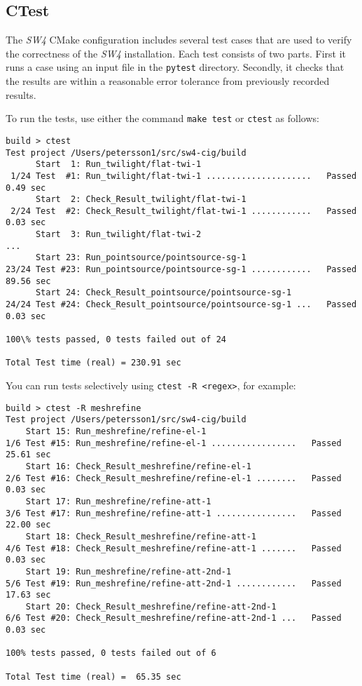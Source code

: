 \documentclass[11pt]{article}
\begin{document}
\subsection{CTest}\label{cha:ctest-sw4}
The \emph{SW4} CMake configuration includes several test cases that are used to verify the correctness
of the \emph{SW4} installation.  Each test consists of two parts. First it runs a case using an input
file in the \verb+pytest+ directory. Secondly, it checks that the results are within
a reasonable error tolerance from previously recorded results.

To run the tests, use either the command \texttt{make test} or \texttt{ctest} as follows:
%
\begin{verbatim}
build > ctest
Test project /Users/petersson1/src/sw4-cig/build
      Start  1: Run_twilight/flat-twi-1
 1/24 Test  #1: Run_twilight/flat-twi-1 .....................   Passed    0.49 sec
      Start  2: Check_Result_twilight/flat-twi-1
 2/24 Test  #2: Check_Result_twilight/flat-twi-1 ............   Passed    0.03 sec
      Start  3: Run_twilight/flat-twi-2
...
      Start 23: Run_pointsource/pointsource-sg-1
23/24 Test #23: Run_pointsource/pointsource-sg-1 ............   Passed   89.56 sec
      Start 24: Check_Result_pointsource/pointsource-sg-1
24/24 Test #24: Check_Result_pointsource/pointsource-sg-1 ...   Passed    0.03 sec

100\% tests passed, 0 tests failed out of 24

Total Test time (real) = 230.91 sec
\end{verbatim}

You can run tests selectively using \texttt{ctest -R \textless regex\textgreater}, for example:
%
\begin{verbatim}
build > ctest -R meshrefine
Test project /Users/petersson1/src/sw4-cig/build
    Start 15: Run_meshrefine/refine-el-1
1/6 Test #15: Run_meshrefine/refine-el-1 .................   Passed   25.61 sec
    Start 16: Check_Result_meshrefine/refine-el-1
2/6 Test #16: Check_Result_meshrefine/refine-el-1 ........   Passed    0.03 sec
    Start 17: Run_meshrefine/refine-att-1
3/6 Test #17: Run_meshrefine/refine-att-1 ................   Passed   22.00 sec
    Start 18: Check_Result_meshrefine/refine-att-1
4/6 Test #18: Check_Result_meshrefine/refine-att-1 .......   Passed    0.03 sec
    Start 19: Run_meshrefine/refine-att-2nd-1
5/6 Test #19: Run_meshrefine/refine-att-2nd-1 ............   Passed   17.63 sec
    Start 20: Check_Result_meshrefine/refine-att-2nd-1
6/6 Test #20: Check_Result_meshrefine/refine-att-2nd-1 ...   Passed    0.03 sec

100% tests passed, 0 tests failed out of 6

Total Test time (real) =  65.35 sec
\end{verbatim}
\end{document}
